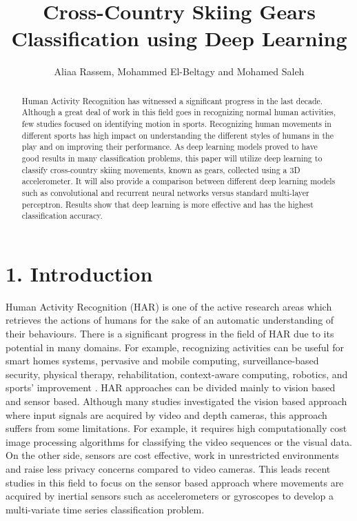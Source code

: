\documentclass[12pt,a4paper]{article}
\title{\textbf{Cross-Country Skiing Gears Classification using Deep Learning}}
\author{Aliaa Rassem, Mohammed El-Beltagy and Mohamed Saleh}
\date{}
\begin{document}
\maketitle

\begin{abstract}
Human Activity Recognition has witnessed a significant progress in the last decade. Although a great deal of work in this field goes in recognizing normal human activities, few studies focused on identifying motion in sports. Recognizing human movements in different sports has high impact on understanding the different styles of humans in the play and on improving their performance. As deep learning models proved to have good results in many classification problems, this paper will utilize deep learning to classify cross-country skiing movements, known as gears, collected using a 3D accelerometer. It will also provide a comparison between different deep learning models such as convolutional and recurrent neural networks versus standard multi-layer perceptron. Results show that deep learning is more effective and has the highest classification accuracy.
\end{abstract}



\section*{1. Introduction}
Human Activity Recognition (HAR) is one of the active research areas which retrieves the actions of humans for the sake of an automatic understanding of their behaviours. There is a significant progress in the field of HAR due to its potential in many domains. For example, recognizing activities can be useful for smart homes systems, pervasive and mobile computing,  surveillance-based security, physical therapy, rehabilitation, context-aware computing, robotics, and sports' improvement \cite{chen2015survey}. HAR approaches can be divided mainly to vision based and sensor based. Although many studies investigated the vision based approach where input signals are acquired by video and depth cameras, this approach suffers from some limitations. For example, it requires high computationally cost image processing algorithms for classifying the video sequences or the visual data. On the other side, sensors are cost effective,  work in unrestricted environments and raise less privacy concerns compared to video cameras. This leads recent studies in this field to focus on the sensor based approach where movements are acquired by inertial sensors such as accelerometers or gyroscopes  to develop a multi-variate time series classification problem.
\end{document}
